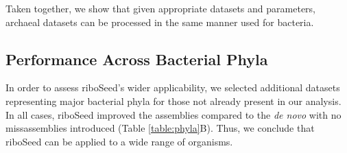 Taken together, we show that given appropriate datasets and parameters, archaeal datasets can be processed in the same manner used for bacteria.

\subsection*{Performance Across Bacterial Phyla}
In order to assess riboSeed's wider applicability, we selected additional datasets representing major bacterial phyla for those not already present in our analysis. In all cases, riboSeed improved the assemblies compared to the \textit{de novo} with no missassemblies introduced (Table \ref{table:phyla}B). Thus, we conclude that riboSeed can be applied to a wide range of organisms.
